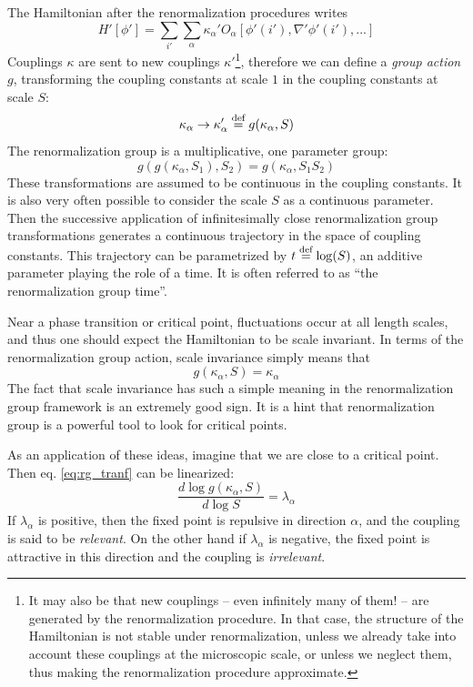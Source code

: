 The Hamiltonian after the renormalization procedures writes
\begin{equation}
H'[\phi'] = \sum_{i'} \sum_\alpha \kappa_\alpha' O_\alpha[\phi'(i'), \nabla' \phi'(i'), ...]
\end{equation}
Couplings $\kappa$ are sent to new couplings $\kappa'$\footnote{It may also be that new couplings -- even infinitely many of them! -- are generated by the renormalization procedure. In that case, the structure of the Hamiltonian is not stable under renormalization, unless we already take into account these couplings at the microscopic scale, or unless we neglect them, thus making the renormalization procedure approximate.}, therefore we can define a \textit{group action} $g$, transforming the coupling constants at scale $1$ in the coupling constants at scale $S$:
\begin{equation}
\label{eq:rg_tranf}
\kappa_\alpha \rightarrow \kappa_\alpha'  \overset{\text{def}}{=}  g(\kappa_\alpha, S)
\end{equation}
The renormalization group is a multiplicative, one parameter group:
\begin{equation}
g( g(\kappa_\alpha, S_1), S_2) = g(\kappa_\alpha, S_1 S_2)
\end{equation}
These transformations are assumed to be continuous in the coupling constants. It is also very often possible to consider the scale $S$ as a continuous parameter. Then the successive application of infinitesimally close renormalization group transformations generates a continuous trajectory in the space of coupling constants. This trajectory can be parametrized by $t  \overset{\text{def}}{=}  \log(S)$, an additive parameter playing the role of a time. It is often referred to as ``the renormalization group time''.

Near a phase transition or critical point, fluctuations occur at all length scales, and thus one should expect the Hamiltonian to be scale invariant. 
In terms of the renormalization group action, scale invariance simply means that
\begin{equation}
g(\kappa_\alpha, S) = \kappa_\alpha
\end{equation}
The fact that scale invariance has such a simple meaning in the renormalization group framework is an extremely good sign. It is a hint that renormalization group is a powerful tool to look for critical points.

As an application of these ideas, imagine that we are close to a critical point. Then eq. \eqref{eq:rg_tranf} can be linearized:
\begin{equation}
\frac{d \log g(\kappa_\alpha, S)}{d \log S} = \lambda_\alpha
\end{equation}
If $\lambda_\alpha$ is positive, then the fixed point is repulsive in direction $\alpha$, and the coupling is said to be \textit{relevant}. On the other hand if $\lambda_\alpha$ is negative, the fixed point is attractive in this direction and the coupling is \textit{irrelevant}.

